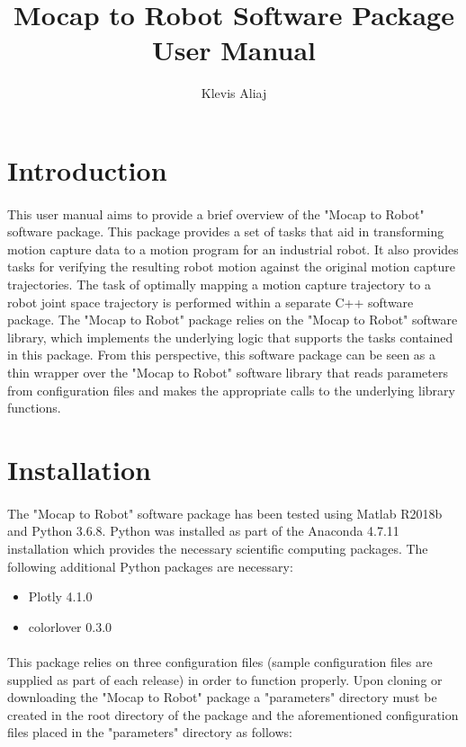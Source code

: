 \documentclass[letterpaper]{article}
\title{\textbf{Mocap to Robot Software Package User Manual}}
\author{Klevis Aliaj}
\date{} %
\begin{document}
\maketitle
\section{Introduction}
\paragraph{}
This user manual aims to provide a brief overview of the "Mocap to Robot" software package. This package provides a set of tasks that aid in transforming motion capture data to a motion program for an industrial robot. It also provides tasks for verifying the resulting robot motion against the original motion capture trajectories. The task of optimally mapping a motion capture trajectory to a robot joint space trajectory is performed within a separate C++ software package. The "Mocap to Robot" package relies on the "Mocap to Robot" software library, which implements the underlying logic that supports the tasks contained in this package. From this perspective, this software package can be seen as a thin wrapper over the "Mocap to Robot" software library that reads parameters from configuration files and makes the appropriate calls to the underlying library functions.

\section{Installation}
\paragraph{}
The "Mocap to Robot" software package has been tested using Matlab R2018b and Python 3.6.8. Python was installed as part of the Anaconda 4.7.11 installation which provides the necessary scientific computing packages. The following additional Python packages are necessary:
\begin{itemize}
	\item Plotly 4.1.0
	\item colorlover 0.3.0
\end{itemize}

\paragraph{}
This package relies on three configuration files (sample configuration files are supplied as part of each release) in order to function properly. Upon cloning or downloading the "Mocap to Robot" package a "parameters" directory must be created in the root directory of the package and the aforementioned configuration files placed in the "parameters" directory as follows:
\end{document}
